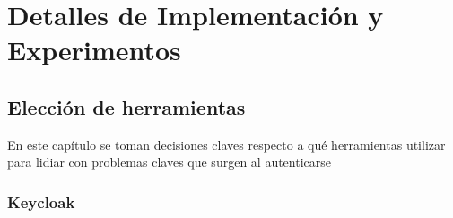\chapter{Detalles de Implementación y Experimentos}\label{chapter:implementation}

\section*{Elección de herramientas}
En este capítulo se toman decisiones claves respecto a qué herramientas utilizar para lidiar con problemas claves que surgen al autenticarse


\subsection{Keycloak}

